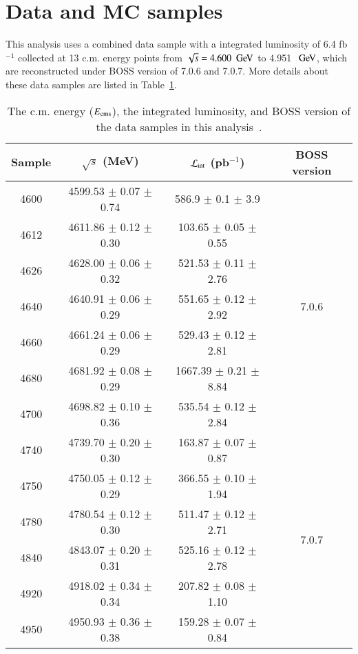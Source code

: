 \clearpage
\section{Data and MC samples}
\label{sec:sample}
This analysis uses a combined data sample with a integrated luminosity of 6.4 fb$^{-1}$ collected at 13 c.m. energy points from $\sqrt{s}=4.600~\gev$ to 4.951~$\gev$, which are reconstructed under BOSS version of 7.0.6 and 7.0.7. More details about these data samples are listed in Table~\ref{tab:datainfo}.

\begin{table}[htbp]
    \centering
    \caption{The c.m. energy ($E_{\rm cms}$), the integrated luminosity, and BOSS version of the data samples in this analysis~\cite{BESIII:2015qfd,BESIII:2015zbz,BESIII:2022dxl,BESIII:2022ulv}.}
    \begin{tabular}{cccc}\hline\hline
        Sample  &  $\sqrt{s}$ (MeV) & $\mathcal{L}_{\rm int}$ (pb$^{-1}$)  & BOSS version \\\hline
        4600    & 4599.53 $\pm$ 0.07 $\pm$ 0.74 & 586.9 $\pm$ 0.1 $\pm$ 3.9 & \multirow{7}{4em}{7.0.6}\\
        4612    & 4611.86 $\pm$ 0.12 $\pm$ 0.30 & 103.65 $\pm$ 0.05 $\pm$ 0.55 \\
        4626    & 4628.00 $\pm$ 0.06 $\pm$ 0.32 & 521.53 $\pm$ 0.11 $\pm$ 2.76 \\
        4640    & 4640.91 $\pm$ 0.06 $\pm$ 0.29 & 551.65 $\pm$ 0.12 $\pm$ 2.92 \\
        4660    & 4661.24 $\pm$ 0.06 $\pm$ 0.29 & 529.43 $\pm$ 0.12 $\pm$ 2.81\\
        4680    & 4681.92 $\pm$ 0.08 $\pm$ 0.29 & 1667.39 $\pm$ 0.21 $\pm$ 8.84\\
        4700    & 4698.82 $\pm$ 0.10 $\pm$ 0.36 & 535.54 $\pm$ 0.12 $\pm$ 2.84 \\\hline
        4740    & 4739.70 $\pm$ 0.20 $\pm$ 0.30 & 163.87 $\pm$ 0.07 $\pm$ 0.87 & \multirow{6}{4em}{7.0.7}\\
        4750    & 4750.05 $\pm$ 0.12 $\pm$ 0.29 & 366.55 $\pm$ 0.10 $\pm$ 1.94 \\
        4780    & 4780.54 $\pm$ 0.12 $\pm$ 0.30 & 511.47 $\pm$ 0.12 $\pm$ 2.71 \\
        4840    & 4843.07 $\pm$ 0.20 $\pm$ 0.31 & 525.16 $\pm$ 0.12 $\pm$ 2.78 \\
        4920    & 4918.02 $\pm$ 0.34 $\pm$ 0.34 & 207.82 $\pm$ 0.08 $\pm$ 1.10\\
        4950    & 4950.93 $\pm$ 0.36 $\pm$ 0.38 & 159.28 $\pm$ 0.07 $\pm$ 0.84\\
        \hline\hline
    \end{tabular}
    \label{tab:datainfo}
\end{table}

